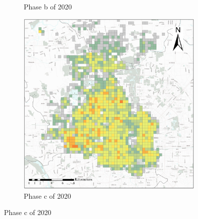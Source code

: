 \documentclass[preprints,ijgi,submit,moreauthors]{Definitions/mdpi}
\begin{document}
\begin{figure}[ht]
\begin{subfigure}{.3\textwidth}
        \caption{Phase b of 2020}
    \end{subfigure}
    \begin{subfigure}{.3\textwidth}
        \includegraphics[width=\textwidth]{Figures/BSSPhase3_2020.eps}
        \caption{Phase c of 2020}
    \end{subfigure}
    

\end{figure}
\end{document}
